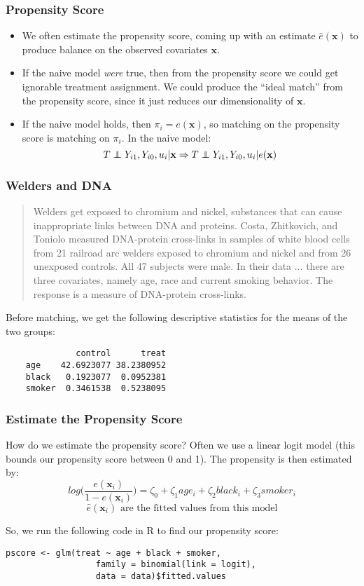\documentclass{beamer}
\newcommand\independent{\protect\mathpalette{\protect\independenT}{\perp}}
\def\independenT#1#2{\mathrel{\rlap{$#1#2$}\mkern2mu{#1#2}}}
\begin{document}
\begin{frame}[c]\frametitle{Propensity Score}
	\begin{itemize}
		\item<+-> We often estimate the propensity score, coming up with an estimate $\hat{e}(\mathbf{x})$ to produce balance on the observed covariates $\mathbf{x}$. 
		\item<+-> If the naive model \emph{were} true, then from the propensity score we could get ignorable treatment assignment.  We could produce the ``ideal match'' from the propensity score, since it just reduces our dimensionality of $\mathbf{x}$.
		\item<+->  If the naive model holds, then $\pi_i = e(\mathbf{x})$, so matching on the propensity score is matching on $\pi_i$.  In the naive model:
		\[ T \independent Y_{i1}, Y_{i0}, u_i | \mathbf{x} \Rightarrow T \independent Y_{i1}, Y_{i0}, u_i | e(\mathbf{x}) \] 
	\end{itemize}
\end{frame}

\begin{frame}[fragile]\frametitle{Welders and DNA}
	
	\begin{quote}
		Welders get exposed to chromium and nickel, substances that can cause inappropriate links between DNA and proteins.  Costa, Zhitkovich, and Toniolo measured DNA-protein cross-links in samples of white blood cells from 21 railroad arc welders exposed to chromium and nickel and from 26 unexposed controls.  All 47 subjects were male. In their data $\dots$ there are three covariates, namely age, race and current smoking behavior.  The response is a measure of DNA-protein cross-links.
	\end{quote}

	Before matching, we get the following descriptive statistics for the means of the two groups:

	\begin{verbatim}
	          control      treat
	age    42.6923077 38.2380952
	black   0.1923077  0.0952381
	smoker  0.3461538  0.5238095
	\end{verbatim}

\end{frame}
\begin{frame}[fragile]\frametitle{Estimate the Propensity Score}
	How do we estimate the propensity score?  Often we use a linear logit model (this bounds our propensity score between 0 and 1).  The propensity is then estimated by:
	\[ log \big( \frac{e(\mathbf{x}_i)}{1 - e(\mathbf{x}_i)}\big) = \zeta_0 + \zeta_1 age_i + \zeta_2 black_i + \zeta_3 smoker_i \]
	\[ \hat{e}(\mathbf{x}_i) \text{ are the fitted values from this model}\]

	So, we run the following code in R to find our propensity score:
	\begin{lstlisting}[frame=single]
	pscore <- glm(treat ~ age + black + smoker,
		          family = binomial(link = logit), 
		          data = data)$fitted.values
	\end{lstlisting}
\end{frame}
\end{document}
